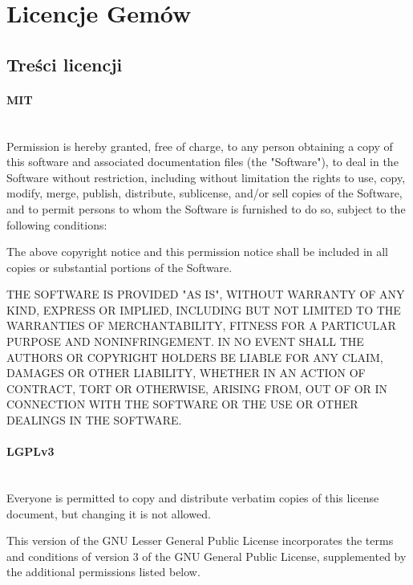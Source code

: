 \documentclass[11pt,a4paper, twoside]{article}
\begin{document}
\section{Licencje Gemów}
\subsection{Treści licencji}
\paragraph{MIT} ~\\
\newline
Permission is hereby granted, free of charge, to any person obtaining
a copy of this software and associated documentation files (the
"Software"), to deal in the Software without restriction, including
without limitation the rights to use, copy, modify, merge, publish,
distribute, sublicense, and/or sell copies of the Software, and to
permit persons to whom the Software is furnished to do so, subject to
the following conditions:

The above copyright notice and this permission notice shall be
included in all copies or substantial portions of the Software.

THE SOFTWARE IS PROVIDED "AS IS", WITHOUT WARRANTY OF ANY KIND,
EXPRESS OR IMPLIED, INCLUDING BUT NOT LIMITED TO THE WARRANTIES OF
MERCHANTABILITY, FITNESS FOR A PARTICULAR PURPOSE AND
NONINFRINGEMENT. IN NO EVENT SHALL THE AUTHORS OR COPYRIGHT HOLDERS BE
LIABLE FOR ANY CLAIM, DAMAGES OR OTHER LIABILITY, WHETHER IN AN ACTION
OF CONTRACT, TORT OR OTHERWISE, ARISING FROM, OUT OF OR IN CONNECTION
WITH THE SOFTWARE OR THE USE OR OTHER DEALINGS IN THE SOFTWARE.
\newpage
\paragraph{LGPLv3} ~\\
\newline
Everyone is permitted to copy and distribute verbatim copies of this license document, but changing it is not allowed.

This version of the GNU Lesser General Public License incorporates the terms and conditions of version 3 of the GNU General Public License, supplemented by the additional permissions listed below.
\end{document}
